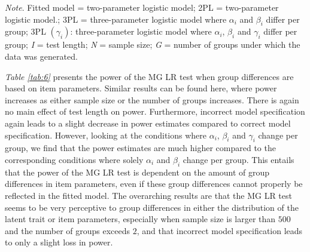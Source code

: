 \documentclass[Royal,sageapa,times,doublespace]{sagej}
\begin{document}
\begin{table}[ht!]
\bigskip
\small\textit{Note}. Fitted model = two-parameter logistic model; 2PL = two-parameter logistic model.; 3PL = three-parameter logistic model where $\alpha_i$ and $\beta_i$ differ per group; 3PL $ (\gamma_i)$: three-parameter logistic model where $\alpha_i$, $\beta_i$ and $\gamma_i$ differ per group; \textit{I} = test length; \textit{N} = sample size; \textit{G} = number of groups under which the data was generated.
\label{tab:6}
\end{table}

\indent \textit{Table \ref{tab:6}} presents the power of the MG LR test when group differences are based on item parameters. Similar results can be found here, where power increases as either sample size or the number of groups increases. There is again no main effect of test length on power. Furthermore, incorrect model specification again leads to a slight decrease in power estimates compared to correct model specification. However, looking at the conditions where $\alpha_i$, $\beta_i$ and $\gamma_i$ change per group, we find that the power estimates are much higher compared to the corresponding conditions where solely $\alpha_i$ and $\beta_i$ change per group. This entails that the power of the MG LR test is dependent on the amount of group differences in item parameters, even if these group differences cannot properly be reflected in the fitted model. The overarching results are that the MG LR test seems to be very perceptive to group differences in either the distribution of the latent trait or item parameters, especially when sample size is larger than $500$ and the number of groups exceeds $2$, and that incorrect model specification leads to only a slight loss in power.\\
\end{document}
